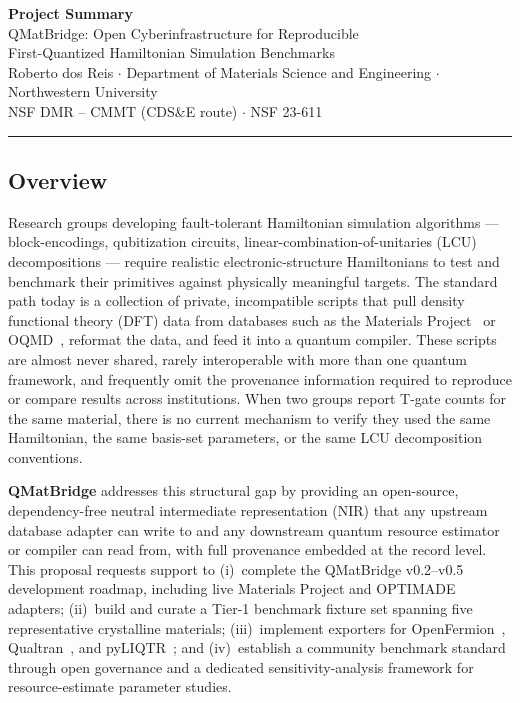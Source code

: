 \documentclass[11pt]{article}
\begin{document}
\thispagestyle{empty}
\begin{center}
  {\LARGE\bfseries\color{nsfblue} Project Summary}\\[6pt]
  {\large QMatBridge: Open Cyberinfrastructure for Reproducible\\
  First-Quantized Hamiltonian Simulation Benchmarks}\\[4pt]
  {\normalsize
  Roberto dos Reis $\cdot$ Department of Materials Science and Engineering
  $\cdot$ Northwestern University\\
  NSF DMR -- CMMT (CDS\&E route) $\cdot$ NSF 23-611}
\end{center}

\noindent\rule{\linewidth}{0.6pt}

\subsection*{Overview}

Research groups developing fault-tolerant Hamiltonian simulation algorithms
--- block-encodings, qubitization circuits, linear-combination-of-unitaries
(LCU) decompositions --- require realistic electronic-structure Hamiltonians
to test and benchmark their primitives against physically meaningful targets.
The standard path today is a collection of private, incompatible scripts that
pull density functional theory (DFT) data from databases such as the
Materials Project~\cite{Jain2013} or OQMD~\cite{Kirklin2015}, reformat the
data, and feed it into a quantum compiler.
These scripts are almost never shared, rarely interoperable with more than one
quantum framework, and frequently omit the provenance information required to
reproduce or compare results across institutions.
When two groups report T-gate counts for the same material, there is no
current mechanism to verify they used the same Hamiltonian, the same
basis-set parameters, or the same LCU decomposition conventions.

\textbf{QMatBridge} addresses this structural gap by providing an open-source,
dependency-free neutral intermediate representation (NIR) that any upstream
database adapter can write to and any downstream quantum resource estimator
or compiler can read from, with full provenance embedded at the record level.
This proposal requests support to (i)~complete the QMatBridge v0.2--v0.5
development roadmap, including live Materials Project and OPTIMADE adapters;
(ii)~build and curate a Tier-1 benchmark fixture set spanning five
representative crystalline materials; (iii)~implement exporters for
OpenFermion~\cite{McClean2020}, Qualtran~\cite{Qualtran2023}, and
pyLIQTR~\cite{pyLIQTR2023}; and (iv)~establish a community benchmark
standard through open governance and a dedicated sensitivity-analysis
framework for resource-estimate parameter studies.
\end{document}

